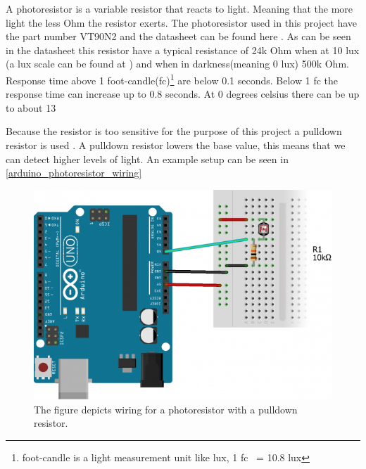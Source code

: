 A photoresistor is a variable resistor that reacts to light. Meaning that the more light the less Ohm the resistor exerts. The photoresistor used in this project have the part number VT90N2 and the datasheet can be found here \cite{photoresistor_sheet}. As can be seen in the datasheet this resistor have a typical resistance of 24k Ohm when at 10 lux (a lux scale can be found at \cite{lux_scale}) and when in darkness(meaning 0 lux) 500k Ohm. Response time above 1 foot-candle(fc)\footnote{foot-candle is a light measurement unit like lux, 1 fc ~= 10.8 lux} are below 0.1 seconds. Below 1 fc the response time can increase up to 0.8 seconds. At 0 degrees celsius there can be up to about 13%

Because the resistor is too sensitive for the purpose of this project a pulldown resistor is used \cite{pulldown_resistor}. A pulldown resistor lowers the base value, this means that we can detect higher levels of light. An example setup can be seen in \cref{arduino_photoresistor_wiring}
\begin{figure}[htbp]
  \centering
  \includegraphics[width=\textwidth]{Design/PhotoSensorTests/Images/photoresistor_setup.png}
  \caption{The figure depicts wiring for a photoresistor with a pulldown resistor.}
  \label{fig:arduino_photoresistor_wiring}
\end{figure}


